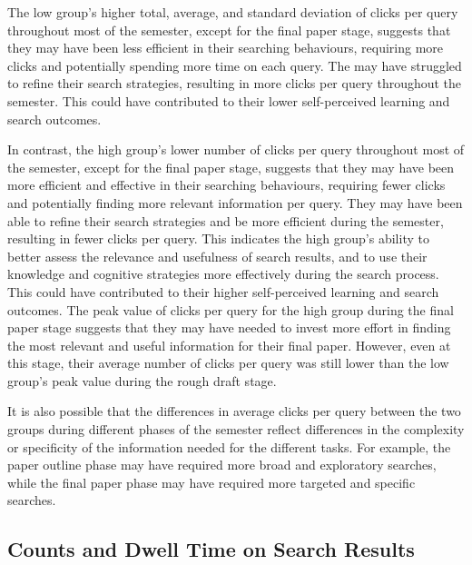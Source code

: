 \documentclass[letterpaper, nobind]{templates/ociamthesis}
\begin{document}
The low group's higher total, average, and standard deviation of clicks per query throughout most of the semester, except for the final paper stage, suggests that they may have been less efficient in their searching behaviours, requiring more clicks and potentially spending more time on each query.
The may have struggled to refine their search strategies, resulting in more clicks per query throughout the semester.
This could have contributed to their lower self-perceived learning and search outcomes.

In contrast, the high group's lower number of clicks per query throughout most of the semester, except for the final paper stage, suggests that they may have been more efficient and effective in their searching behaviours, requiring fewer clicks and potentially finding more relevant information per query.
They may have been able to refine their search strategies and be more efficient during the semester, resulting in fewer clicks per query.
This indicates the high group's ability to better assess the relevance and usefulness of search results, and to use their knowledge and cognitive strategies more effectively during the search process.
This could have contributed to their higher self-perceived learning and search outcomes.
The peak value of clicks per query for the high group during the final paper stage suggests that they may have needed to invest more effort in finding the most relevant and useful information for their final paper.
However, even at this stage, their average number of clicks per query was still lower than the low group's peak value during the rough draft stage.

It is also possible that the differences in average clicks per query between the two groups during different phases of the semester reflect differences in the complexity or specificity of the information needed for the different tasks. For example, the paper outline phase may have required more broad and exploratory searches, while the final paper phase may have required more targeted and specific searches.

\hypertarget{sec-phase2-res-L-dt}{%
\subsection{Counts and Dwell Time on Search Results}\label{sec-phase2-res-L-dt}}
\end{document}
